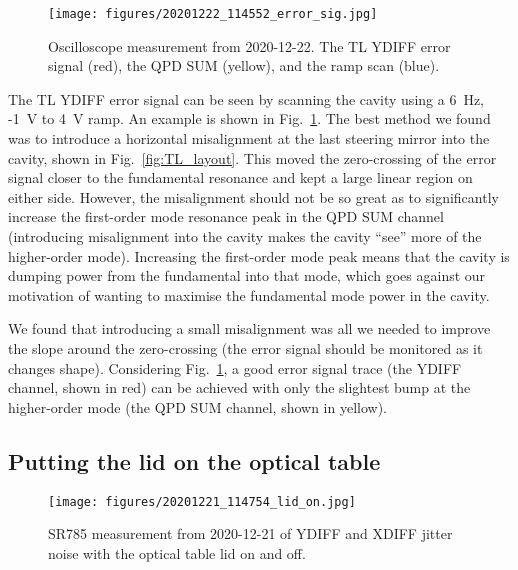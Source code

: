 \documentclass[aps,pra,superscriptaddress,reprint,nofootinbib]{revtex4-1}
\begin{document}
\begin{figure}
\texttt{[image: figures/20201222\_114552\_error\_sig.jpg]}
\caption{Oscilloscope measurement from 2020-12-22. The TL YDIFF error signal (red), the QPD SUM (yellow), and the ramp scan (blue).}
\label{fig:TL_error_sig_example}
\end{figure}

The TL YDIFF error signal can be seen by scanning the cavity using a 6~Hz, -1~V to 4~V ramp. An example is shown in Fig.~\ref{fig:TL_error_sig_example}. The best method we found was to introduce a horizontal misalignment at the last steering mirror into the cavity, shown in Fig.~\ref{fig:TL_layout}. This moved the zero-crossing of the error signal closer to the fundamental resonance and kept a large linear region on either side. However, the misalignment should not be so great as to significantly increase the first-order mode resonance peak in the QPD SUM channel (introducing misalignment into the cavity makes the cavity ``see'' more of the higher-order mode).
Increasing the first-order mode peak means that the cavity is dumping power from the fundamental into that mode, which goes against our motivation of wanting to maximise the fundamental mode power in the cavity.

We found that introducing a small misalignment was all we needed to improve the slope around the zero-crossing (the error signal should be monitored as it changes shape). Considering Fig.~\ref{fig:TL_error_sig_example}, a good error signal trace (the YDIFF channel, shown in red) can be achieved with only the slightest bump at the higher-order mode (the QPD SUM channel, shown in yellow).

\subsection{Putting the lid on the optical table}

\begin{figure}
\texttt{[image: figures/20201221\_114754\_lid\_on.jpg]}
\caption{SR785 measurement from 2020-12-21 of YDIFF and XDIFF jitter noise with the optical table lid on and off.}
\label{fig:jitter_noise_lid_on}
\end{figure}
\end{document}
